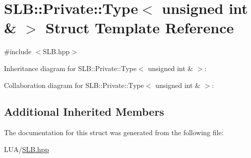 \hypertarget{structSLB_1_1Private_1_1Type_3_01unsigned_01int_01_6_01_4}{}\section{S\+LB\+:\+:Private\+:\+:Type$<$ unsigned int \& $>$ Struct Template Reference}
\label{structSLB_1_1Private_1_1Type_3_01unsigned_01int_01_6_01_4}


{\ttfamily \#include $<$S\+L\+B.\+hpp$>$}



Inheritance diagram for S\+LB\+:\+:Private\+:\+:Type$<$ unsigned int \& $>$\+:


Collaboration diagram for S\+LB\+:\+:Private\+:\+:Type$<$ unsigned int \& $>$\+:
\subsection*{Additional Inherited Members}


The documentation for this struct was generated from the following file\+:\begin{DoxyCompactItemize}
\item 
L\+U\+A/\hyperlink{SLB_8hpp}{S\+L\+B.\+hpp}\end{DoxyCompactItemize}

